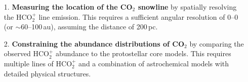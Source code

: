 \documentclass[12pt,a4paper]{article}  %
\newcommand{\carbondioxide}{CO$_2$\xspace}
\newcommand{\protonatedcarbondioxide}{HCO$_2^+$\xspace}
\begin{document}
\vspace{-0.5em}
\begin{enumerate}[leftmargin=*]
    \setlength\itemsep{-0.2em}
    
    \item[1.] \textbf{Measuring the location of the \carbondioxide snowline} by spatially resolving the \protonatedcarbondioxide line emission. This requires a sufficient angular resolution of 0--0 (or $\sim$60--100\,au), assuming the distance of 200\,pc.
    \item[2.] \textbf{Constraining the abundance distributions of \carbondioxide} by comparing the observed \protonatedcarbondioxide abundance to the protostellar core models. This requires multiple lines of \protonatedcarbondioxide and a combination of astrochemical models with detailed physical structures.
\end{enumerate}
\vspace{-0.5em}
\end{document}
